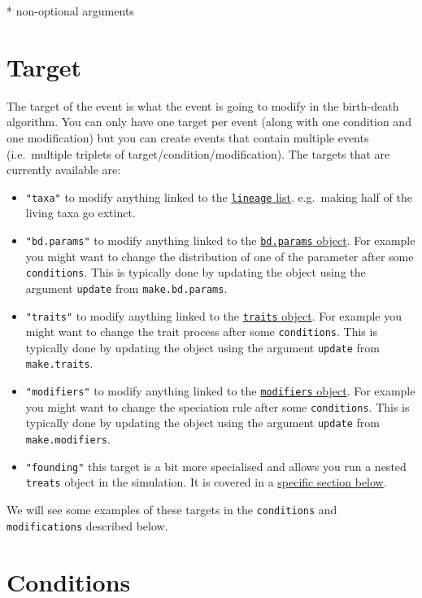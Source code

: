 \documentclass[
]{book}
\providecommand{\tightlist}{%
  \setlength{\itemsep}{0pt}\setlength{\parskip}{0pt}}
\begin{document}
* non-optional arguments

\hypertarget{target}{%
\section{Target}\label{target}}

The target of the event is what the event is going to modify in the birth-death algorithm.
You can only have one target per event (along with one condition and one modification) but you can create events that contain multiple events (i.e.~multiple triplets of target/condition/modification).
The targets that are currently available are:

\begin{itemize}
\tightlist
\item
  \texttt{"taxa"} to modify anything linked to the \protect\hyperlink{allowarguments}{\texttt{lineage} list}. e.g.~making half of the living taxa go extinct.
\item
  \texttt{"bd.params"} to modify anything linked to the \protect\hyperlink{makebdparams}{\texttt{bd.params} object}. For example you might want to change the distribution of one of the parameter after some \texttt{conditions}. This is typically done by updating the object using the argument \texttt{update} from \texttt{make.bd.params}.
\item
  \texttt{"traits"} to modify anything linked to the \protect\hyperlink{maketraits}{\texttt{traits} object}. For example you might want to change the trait process after some \texttt{conditions}. This is typically done by updating the object using the argument \texttt{update} from \texttt{make.traits}.
\item
  \texttt{"modifiers"} to modify anything linked to the \protect\hyperlink{makebdmodifiers}{\texttt{modifiers} object}. For example you might want to change the speciation rule after some \texttt{conditions}. This is typically done by updating the object using the argument \texttt{update} from \texttt{make.modifiers}.
\item
  \texttt{"founding"} this target is a bit more specialised and allows you run a nested \texttt{treats} object in the simulation. It is covered in a \protect\hyperlink{founding}{specific section below}.
\end{itemize}

We will see some examples of these targets in the \texttt{conditions} and \texttt{modifications} described below.

\hypertarget{conditions}{%
\section{Conditions}\label{conditions}}
\end{document}
